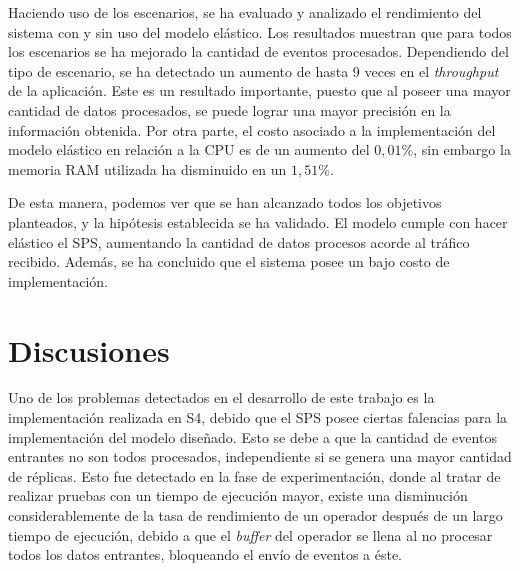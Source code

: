 
Haciendo uso de los escenarios, se ha evaluado y analizado el rendimiento del sistema con y sin uso del modelo elástico. Los resultados muestran que para todos los escenarios se ha mejorado la cantidad de eventos procesados. Dependiendo del tipo de escenario, se ha detectado un aumento de hasta 9 veces en el \textit{throughput} de la aplicación. Este es un resultado importante, puesto que al poseer una mayor cantidad de datos procesados, se puede lograr una mayor precisión en la información obtenida. Por otra parte, el costo asociado a la implementación del modelo elástico en relación a la CPU es de un aumento del $0,01\%$, sin embargo la memoria RAM utilizada ha disminuido en un $1,51\%$.


De esta manera, podemos ver que se han alcanzado todos los objetivos planteados, y la hipótesis establecida se ha validado. El modelo cumple con hacer elástico el SPS, aumentando la cantidad de datos procesos acorde al tráfico recibido. Además, se ha concluido que el sistema posee un bajo costo de implementación.

\section{Discusiones}

Uno de los problemas detectados en el desarrollo de este trabajo es la implementación realizada en S4, debido que el SPS posee ciertas falencias para la implementación del modelo diseñado. Esto se debe a que la cantidad de eventos entrantes no son todos procesados, independiente si se genera una mayor cantidad de réplicas. Esto fue detectado en la fase de experimentación, donde al tratar de realizar pruebas con un tiempo de ejecución mayor, existe una disminución considerablemente de la tasa de rendimiento de un operador después de un largo tiempo de ejecución, debido a que el \textit{buffer} del operador se llena al no procesar todos los datos entrantes, bloqueando el envío de eventos a éste.

